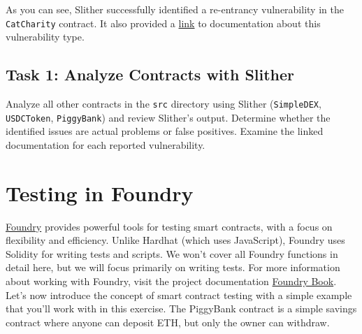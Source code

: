 \documentclass[12pt]{article}
\begin{document}
As you can see, Slither successfully identified a re-entrancy vulnerability in
the \texttt{CatCharity} contract. It also provided a
\href{https://github.com/crytic/slither/wiki/Detector-Documentation#reentrancy-vulnerabilities}{link}
to documentation about this vulnerability type.

\subsection*{Task 1: Analyze Contracts with Slither}
Analyze all other contracts in the \texttt{src} directory using Slither
(\texttt{SimpleDEX}, \texttt{USDCToken}, \texttt{PiggyBank}) and review
Slither's output. Determine whether the identified issues are actual problems
or false positives. Examine the linked documentation for each reported
vulnerability.







\section{Testing in Foundry}

\href{https://github.com/foundry-rs/foundry}{Foundry} provides powerful tools for testing smart contracts, with a focus on flexibility and efficiency. Unlike Hardhat (which uses JavaScript), Foundry uses Solidity for writing tests and scripts. We won't cover all Foundry functions in detail here, but we will focus primarily on writing tests. For more information about working with Foundry, visit the project documentation \href{https://book.getfoundry.sh/}{Foundry Book}. Let's now introduce the concept of smart contract testing with a simple example that you'll work with in this exercise. The PiggyBank contract is a simple savings contract where anyone can deposit ETH, but only the owner can withdraw.
\end{document}
